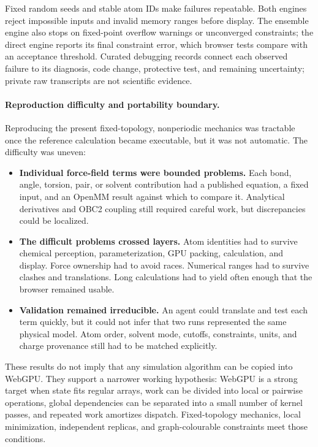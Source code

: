 Fixed random seeds and stable atom IDs make failures repeatable. Both engines
reject impossible inputs and invalid memory ranges before display. The ensemble
engine also stops on fixed-point overflow warnings or unconverged constraints;
the direct engine reports its final constraint error, which browser tests compare
with an acceptance threshold. Curated debugging records connect each observed
failure to its diagnosis, code change, protective test, and remaining
uncertainty; private raw transcripts are not scientific evidence.

\paragraph{Reproduction difficulty and portability boundary.}
Reproducing the present fixed-topology, nonperiodic mechanics was tractable once
the reference calculation became executable, but it was not automatic. The
difficulty was uneven:

\begin{itemize}
  \item \textbf{Individual force-field terms were bounded problems.} Each bond,
    angle, torsion, pair, or solvent contribution had a published equation, a
    fixed input, and an OpenMM result against which to compare it. Analytical
    derivatives and OBC2 coupling still required careful work, but discrepancies
    could be localized.
  \item \textbf{The difficult problems crossed layers.} Atom identities had to
    survive chemical perception, parameterization, GPU packing, calculation,
    and display. Force ownership had to avoid races. Numerical ranges had to
    survive clashes and translations. Long calculations had to yield often
    enough that the browser remained usable.
  \item \textbf{Validation remained irreducible.} An agent could translate and
    test each term quickly, but it could not infer that two runs represented the
    same physical model. Atom order, solvent mode, cutoffs, constraints, units,
    and charge provenance still had to be matched explicitly.
\end{itemize}

These results do not imply that any simulation algorithm can be copied into
WebGPU. They support a narrower working hypothesis: WebGPU is a strong target
when state fits regular arrays, work can be divided into local or pairwise
operations, global dependencies can be separated into a small number of kernel
passes, and repeated work amortizes dispatch. Fixed-topology mechanics, local
minimization, independent replicas, and graph-colourable constraints meet those
conditions.

